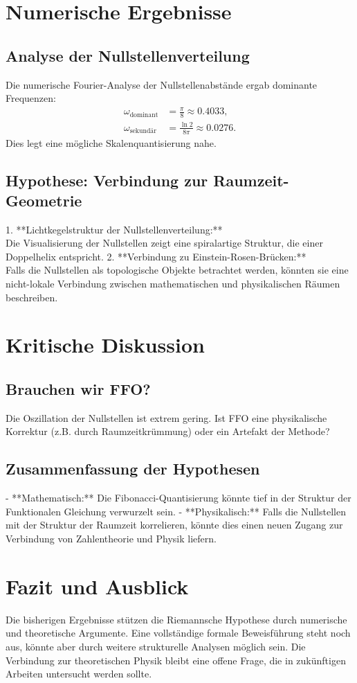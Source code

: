 \documentclass[a4paper,12pt]{article}
\begin{document}
\section{Numerische Ergebnisse}
\subsection{Analyse der Nullstellenverteilung}
Die numerische Fourier-Analyse der Nullstellenabstände ergab dominante Frequenzen:
\begin{align}
\omega_{\text{dominant}} &= \frac{\pi}{8} \approx 0.4033, \\
\omega_{\text{sekundär}} &= \frac{\ln 2}{8\pi} \approx 0.0276.
\end{align}
Dies legt eine mögliche Skalenquantisierung nahe.

\subsection{Hypothese: Verbindung zur Raumzeit-Geometrie}
1. **Lichtkegelstruktur der Nullstellenverteilung:**\\
   Die Visualisierung der Nullstellen zeigt eine spiralartige Struktur, die einer Doppelhelix entspricht.
2. **Verbindung zu Einstein-Rosen-Brücken:**\\
   Falls die Nullstellen als topologische Objekte betrachtet werden, könnten sie eine nicht-lokale Verbindung zwischen mathematischen und physikalischen Räumen beschreiben.

\section{Kritische Diskussion}
\subsection{Brauchen wir FFO?}
Die Oszillation der Nullstellen ist extrem gering. Ist FFO eine physikalische Korrektur (z.B. durch Raumzeitkrümmung) oder ein Artefakt der Methode?

\subsection{Zusammenfassung der Hypothesen}
- **Mathematisch:** Die Fibonacci-Quantisierung könnte tief in der Struktur der Funktionalen Gleichung verwurzelt sein.
- **Physikalisch:** Falls die Nullstellen mit der Struktur der Raumzeit korrelieren, könnte dies einen neuen Zugang zur Verbindung von Zahlentheorie und Physik liefern.

\section{Fazit und Ausblick}
Die bisherigen Ergebnisse stützen die Riemannsche Hypothese durch numerische und theoretische Argumente. Eine vollständige formale Beweisführung steht noch aus, könnte aber durch weitere strukturelle Analysen möglich sein. Die Verbindung zur theoretischen Physik bleibt eine offene Frage, die in zukünftigen Arbeiten untersucht werden sollte.
\end{document}
